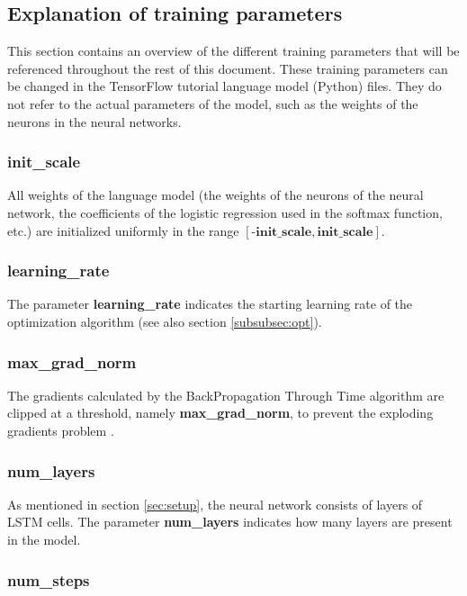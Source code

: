 \documentclass[10pt,a4paper,titlepage]{article}
\begin{document}
\subsection{Explanation of training parameters}
\label{subsec:exp}

This section contains an overview of the different training parameters that will be referenced throughout the rest of this document. These training parameters can be changed in the TensorFlow tutorial language model (Python) files. They do not refer to the actual parameters of the model, such as the weights of the neurons in the neural networks.

\subsubsection{init\_scale}
	
All weights of the language model (the weights of the neurons of the neural network, the coefficients of the logistic regression used in the softmax function, etc.) are initialized uniformly in the range $[\textbf{-init\_scale},\textbf{init\_scale}]$.

\subsubsection{learning\_rate}

The parameter \textbf{learning\_rate} indicates the starting learning rate of the optimization algorithm (see also section \ref{subsubsec:opt}).

\subsubsection{max\_grad\_norm}

The gradients calculated by the BackPropagation Through Time algorithm are clipped at a threshold, namely \textbf{max\_grad\_norm}, to prevent the exploding gradients problem \cite{bptt,exp}.

\subsubsection{num\_layers}

As mentioned in section \ref{sec:setup}, the neural network consists of layers of LSTM cells. The parameter \textbf{num\_layers} indicates how many layers are present in the model.

\subsubsection{num\_steps}
\label{subsubsec:numsteps}
\end{document}
